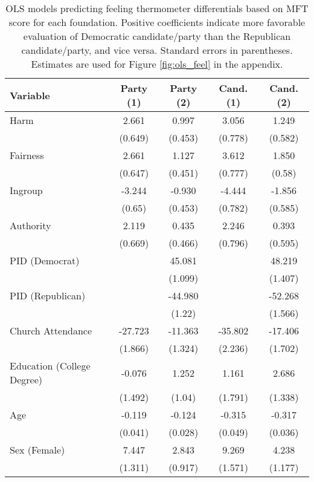 \begin{table}[h]
\centering
\caption[OLS models predicting feeling thermometer differentials based on
           MFT score for each foundation]{OLS models predicting feeling thermometer differentials based on
           MFT score for each foundation. Positive coefficients indicate more favorable evaluation 
           of Democratic candidate/party than the Republican candidate/party, and vice versa. 
           Standard errors in parentheses. Estimates are used for Figure \ref{fig:ols_feel} 
           in the appendix.} 
\label{tab:ols_feel}
\begingroup\footnotesize
\begin{tabular}{lcccc}
  \hline
Variable & Party (1) & Party (2) & Cand. (1) & Cand. (2) \\ 
  \hline
Harm &   2.661 &   0.997 &   3.056 &   1.249 \\ 
   & (0.649) & (0.453) & (0.778) & (0.582) \\ 
  Fairness &   2.661 &   1.127 &   3.612 &   1.850 \\ 
   & (0.647) & (0.451) & (0.777) & (0.58) \\ 
  Ingroup &  -3.244 &  -0.930 &  -4.444 &  -1.856 \\ 
   & (0.65) & (0.453) & (0.782) & (0.585) \\ 
  Authority &   2.119 &   0.435 &   2.246 &   0.393 \\ 
   & (0.669) & (0.466) & (0.796) & (0.595) \\ 
  PID (Democrat) &  &  45.081 &  &  48.219 \\ 
   &  & (1.099) &  & (1.407) \\ 
  PID (Republican) &  & -44.980 &  & -52.268 \\ 
   &  & (1.22) &  & (1.566) \\ 
  Church Attendance & -27.723 & -11.363 & -35.802 & -17.406 \\ 
   & (1.866) & (1.324) & (2.236) & (1.702) \\ 
  Education (College Degree) &  -0.076 &   1.252 &   1.161 &   2.686 \\ 
   & (1.492) & (1.04) & (1.791) & (1.338) \\ 
  Age &  -0.119 &  -0.124 &  -0.315 &  -0.317 \\ 
   & (0.041) & (0.028) & (0.049) & (0.036) \\ 
  Sex (Female) &   7.447 &   2.843 &   9.269 &   4.238 \\ 
   & (1.311) & (0.917) & (1.571) & (1.177) \\ 

\end{tabular}
\end{table}

